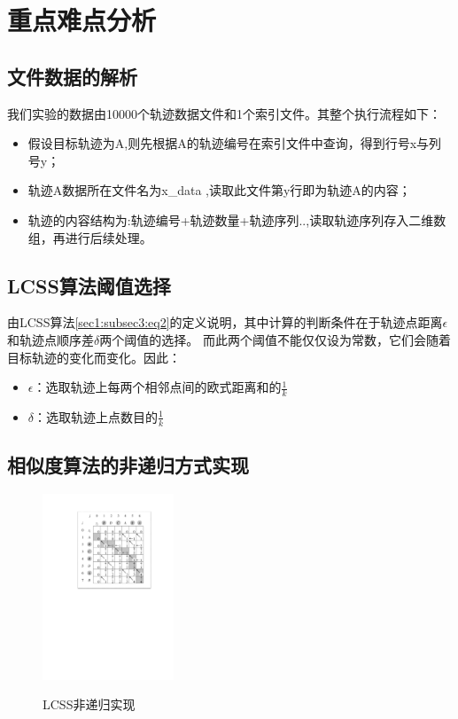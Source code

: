 \documentclass[UTF8]{ctexart}
\begin{document}
\section{重点难点分析}\label{sec2}
\subsection{文件数据的解析}

我们实验的数据由10000个轨迹数据文件和1个索引文件。其整个执行流程如下：

\begin{itemize}
	\item 假设目标轨迹为A,则先根据A的轨迹编号在索引文件中查询，得到行号x与列号y；
	\item 轨迹A数据所在文件名为x\_data ,读取此文件第y行即为轨迹A的内容；
	\item 轨迹的内容结构为:轨迹编号+轨迹数量+轨迹序列..,读取轨迹序列存入二维数组，再进行后续处理。
\end{itemize}

\subsection{LCSS算法阈值选择}

由LCSS算法\ref{sec1:subsec3:eq2}的定义说明，其中计算的判断条件在于轨迹点距离$\epsilon$和轨迹点顺序差$\delta$两个阈值的选择。
而此两个阈值不能仅仅设为常数，它们会随着目标轨迹的变化而变化。因此：

\begin{itemize}
	\item $\epsilon$：选取轨迹上每两个相邻点间的欧式距离和的$\frac{1}{k}$
	\item $\delta$：选取轨迹上点数目的$\frac{1}{k}$
\end{itemize}

\subsection{相似度算法的非递归方式实现}
\label{sec2:subsec3}

\begin{figure}[!htbp]
  \centering
  \includegraphics[width=0.35\textwidth]{fig/fig01.pdf}\\
  \caption{LCSS非递归实现}
  \label{sec2:subsec3:fg1}
\end{figure}
\end{document}
